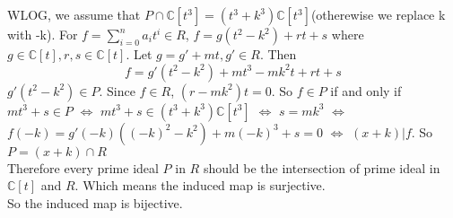 \documentclass{article}
\begin{document}
WLOG, we assume that  $ P\cap \mathbb{C}[t^3]=(t^3+k^3)\mathbb{C}[t^3] $(otherewise we replace k with -k). For  $ f=\sum\limits_{i=0}^n a_it^i\in R $,  $ f=g(t^2-k^2)+rt+s $ where  $ g\in \mathbb{C}[t],r,s\in \mathbb{C}[t] $. Let  $ g=g'+mt,g'\in R $. Then  \[f=g'(t^2-k^2)+mt^3-mk^2t+rt+s \] $ g'(t^2-k^2)\in P $. Since  $ f\in R $,  $ (r-mk^2)t=0 $. So  $ f\in P  $ if and only if  $ mt^3+s\in P $ $ \Leftrightarrow $  $ mt^3+s\in (t^3+k^3)\mathbb{C}[t^3] $ $ \Leftrightarrow $ $ s=mk^3 $ $ \Leftrightarrow $  $ f(-k)=g'(-k)((-k)^2-k^2)+m(-k)^3+s=0 $ $ \Leftrightarrow  $ $ (x+k)|f $. So  $ P=(x+k)\cap R $ \\
Therefore every prime ideal  $ P  $ in  $ R  $ should be the intersection of prime ideal in  $ \mathbb{C}[t] $ and  $ R  $. Which means the induced map is surjective.\\
So the induced map  is bijective.                     

\end{document}
